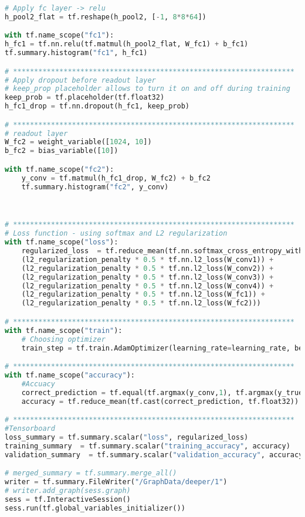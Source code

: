 \begin{lstlisting}[language=Python, label=lst:neuralnet.py, caption={neural\_net.py}, basicstyle=\tiny]
# Apply fc layer -> relu 
h_pool2_flat = tf.reshape(h_pool2, [-1, 8*8*64])

with tf.name_scope("fc1"):
h_fc1 = tf.nn.relu(tf.matmul(h_pool2_flat, W_fc1) + b_fc1)
tf.summary.histogram("fc1", h_fc1)

# *******************************************************************
# Apply dropout before readout layer
# keep_prop placeholder allows to turn it on and off during training
keep_prob = tf.placeholder(tf.float32)
h_fc1_drop = tf.nn.dropout(h_fc1, keep_prob)

# *******************************************************************
# readout layer
W_fc2 = weight_variable([1024, 10])
b_fc2 = bias_variable([10])

with tf.name_scope("fc2"):
	y_conv = tf.matmul(h_fc1_drop, W_fc2) + b_fc2
	tf.summary.histogram("fc2", y_conv)



# *******************************************************************
# Loss function - using softmax and L2 regularization
with tf.name_scope("loss"):
	regularized_loss  = tf.reduce_mean(tf.nn.softmax_cross_entropy_with_logits(labels=y_true, logits=y_conv) +
	(l2_regularization_penalty * 0.5 * tf.nn.l2_loss(W_conv1)) +
	(l2_regularization_penalty * 0.5 * tf.nn.l2_loss(W_conv2)) +
	(l2_regularization_penalty * 0.5 * tf.nn.l2_loss(W_conv3)) +
	(l2_regularization_penalty * 0.5 * tf.nn.l2_loss(W_conv4)) + 
	(l2_regularization_penalty * 0.5 * tf.nn.l2_loss(W_fc1)) + 
	(l2_regularization_penalty * 0.5 * tf.nn.l2_loss(W_fc2)))

# *******************************************************************
with tf.name_scope("train"):
	# Choosing optimizer
	train_step = tf.train.AdamOptimizer(learning_rate=learning_rate, beta1=decay_rate_1_moment, beta2=decay_rate_2_moment, epsilon=epsilon, use_locking=False).minimize(regularized_loss)

# *******************************************************************
with tf.name_scope("accuracy"):
	#Accuacy
	correct_prediction = tf.equal(tf.argmax(y_conv,1), tf.argmax(y_true,1))
	accuracy = tf.reduce_mean(tf.cast(correct_prediction, tf.float32))

# *******************************************************************
#Tensorboard
loss_summary = tf.summary.scalar("loss", regularized_loss)
training_summary  = tf.summary.scalar("training_accuracy", accuracy)
validation_summary  = tf.summary.scalar("validation_accuracy", accuracy)

# merged_summary = tf.summary.merge_all()
writer = tf.summary.FileWriter("/GraphData/deeper/1")
# writer.add_graph(sess.graph)
sess = tf.InteractiveSession()
sess.run(tf.global_variables_initializer())


\end{lstlisting}
